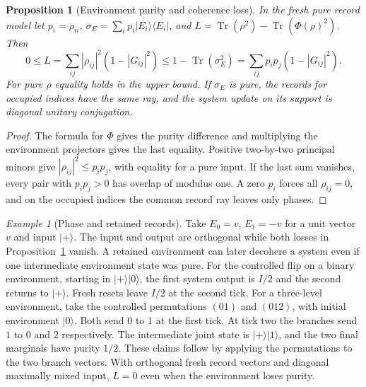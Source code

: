 \documentclass[aps,pra,onecolumn,superscriptaddress,nofootinbib,10pt]{revtex4-2}
\newtheorem{proposition}[theorem]{Proposition}
\theoremstyle{definition}
\theoremstyle{remark}
\newtheorem{example}[theorem]{Example}
\newcommand{\tr}{\operatorname{Tr}}
\begin{document}
\begin{proposition}[Environment purity and coherence loss]\label{ob:purityloss}
In the fresh pure record model let $p_i=\rho_{ii}$,
$\sigma_E=\sum_i p_i|E_i\rangle\langle E_i|$, and
$L=\tr(\rho^2)-\tr(\Phi(\rho)^2)$. Then
\[
 0\le L=\sum_{ij}|\rho_{ij}|^2(1-|G_{ij}|^2)
 \le 1-\tr(\sigma_E^2)=\sum_{ij}p_ip_j(1-|G_{ij}|^2).
\]
For pure $\rho$ equality holds in the upper bound. If $\sigma_E$ is
pure, the records for occupied indices have the same ray, and the
system update on its support is diagonal unitary conjugation.
\end{proposition}
\begin{proof}
The formula for $\Phi$ gives the purity difference and multiplying
the environment projectors gives the last equality. Positive
two-by-two principal minors give $|\rho_{ij}|^2\le p_ip_j$,
with equality for a pure input. If the last sum vanishes, every
pair with $p_ip_j>0$ has overlap of modulus one. A zero $p_i$
forces all $\rho_{ij}=0$, and on the occupied indices the common
record ray leaves only phases.
\end{proof}

\begin{example}[Phase and retained records]\label{ob:recordsexamples}
Take $E_0=v$, $E_1=-v$ for a unit vector $v$ and input $|+\rangle$.
The input and output are orthogonal while both losses in
Proposition~\ref{ob:purityloss} vanish. A retained environment can later
decohere a system even if one intermediate environment state was pure.
For the controlled flip on a binary environment, starting in
$|+\rangle|0\rangle$, the first system output is $I/2$ and the
second returns to $|+\rangle$. Fresh resets leave $I/2$ at the
second tick. For a three-level environment, take the controlled
permutations $(01)$ and $(012)$, with initial environment $|0\rangle$.
Both send $0$ to $1$ at the first tick. At tick two the branches
send $1$ to $0$ and $2$ respectively. The intermediate joint state is
$|+\rangle|1\rangle$, and the two final marginals have purity $1/2$.
These claims follow by applying the permutations to the two branch
vectors. With orthogonal fresh record vectors and diagonal maximally
mixed input, $L=0$ even when the environment loses purity.
\end{example}
\end{document}
